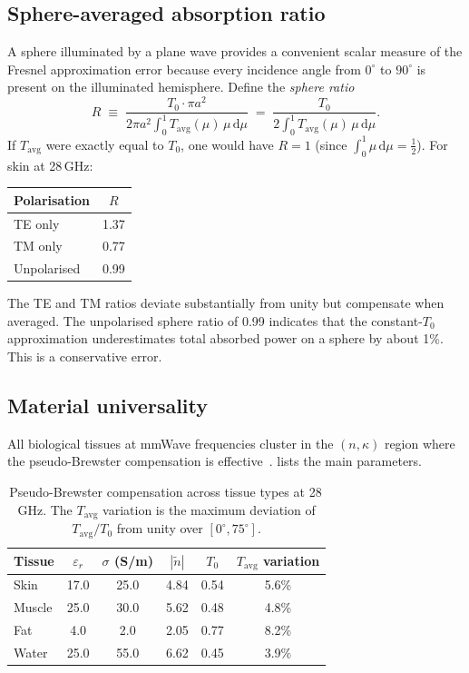 \documentclass[11pt,a4paper]{article}
\theoremstyle{definition}      %
\newcommand{\Tavg}{T_{\mathrm{avg}}}
\newcommand{\ntilde}{\tilde{n}}
\newcommand{\diff}{\mathrm{d}}        %
\begin{document}
\subsection{Sphere-averaged absorption ratio}\label{sec:sphere-ratio}

A sphere illuminated by a plane wave provides a convenient scalar
measure of the Fresnel approximation error because every incidence
angle from $0^\circ$ to $90^\circ$ is present on the illuminated
hemisphere.  Define the \emph{sphere ratio}
\begin{equation}\label{eq:R-sphere}
  R \;\equiv\;
  \frac{T_0 \cdot \pi a^2}{2\pi a^2\int_0^1 \Tavg(\mu)\,\mu\,\diff \mu}
  \;=\; \frac{T_0}{2\int_0^1\Tavg(\mu)\,\mu\,\diff \mu}.
\end{equation}
If $\Tavg$ were exactly equal to $T_0$, one would have $R=1$ (since
$\int_0^1\mu\,\diff \mu=\frac{1}{2}$).  For skin at 28\,GHz:

\begin{center}
\begin{tabular}{lc}
\toprule
Polarisation & $R$ \\
\midrule
TE only  & 1.37 \\
TM only  & 0.77 \\
Unpolarised & 0.99 \\
\bottomrule
\end{tabular}
\end{center}

The TE and TM ratios deviate substantially from unity but compensate
when averaged.  The unpolarised sphere ratio of 0.99 indicates that
the constant-$T_0$ approximation underestimates total absorbed power
on a sphere by about 1\%. This is a conservative error.

\subsection{Material universality}\label{sec:material-universality}

All biological tissues at mmWave frequencies cluster in the
$(n,\kappa)$ region where the pseudo-Brewster compensation is
effective~\cite{Gabriel1996,ITISv5,AlekseevZiskin2007}.
 lists the main parameters.

\begin{table}[!htbp]
\centering
\caption{Pseudo-Brewster compensation across tissue types at
  28\,GHz.  The $\Tavg$ variation is the maximum deviation of
  $\Tavg/T_0$ from unity over $[0^\circ,75^\circ]$.}
\label{tab:materials}
\begin{tabular}{lccccc}
\toprule
Tissue & $\varepsilon_r$ & $\sigma$ (S/m) & $|\ntilde|$ & $T_0$
  & $\Tavg$ variation \\
\midrule
Skin   & 17.0 & 25.0 & 4.84 & 0.54 & 5.6\% \\
Muscle & 25.0 & 30.0 & 5.62 & 0.48 & 4.8\% \\
Fat    &  4.0 &  2.0 & 2.05 & 0.77 & 8.2\% \\
Water  & 25.0 & 55.0 & 6.62 & 0.45 & 3.9\% \\
\bottomrule
\end{tabular}
\end{table}
\end{document}
